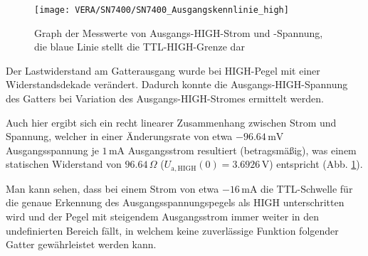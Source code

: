 \begin{figure}[h]
  \begin{center}
    \texttt{[image: VERA/SN7400/SN7400\_Ausgangskennlinie\_high]}
  \end{center}
  \caption{Graph der Messwerte von Ausgangs-HIGH-Strom und -Spannung, die blaue
    Linie stellt die TTL-HIGH-Grenze dar}
  \label{fig:aus_schnib_high}
\end{figure}

Der Lastwiderstand am Gatterausgang wurde bei HIGH-Pegel mit einer
Widerstandsdekade verändert. Dadurch konnte die Ausgangs-HIGH-Spannung des
Gatters bei Variation des Ausgangs-HIGH-Stromes ermittelt werden.


Auch hier
ergibt sich ein recht linearer Zusammenhang zwischen Strom und Spannung, welcher
in einer Änderungsrate von etwa $- 96.64 \, \si{\milli\volt}$ Ausgangsspannung
je $1 \, \si{\milli\ampere}$ Ausgangsstrom resultiert (betragsmäßig), was einem
statischen Widerstand von $96.64 \, \Omega$ ($U_\mathrm{a,HIGH}(0) = 3.6926 \,
\si{\volt}$) entspricht (Abb. \ref{fig:aus_schnib_high}).

Man kann sehen, dass bei einem Strom von etwa $-16
\,\si{\milli\ampere}$ die TTL-Schwelle für die genaue Erkennung des
Ausgangsspannungspegels als HIGH unterschritten wird und der Pegel mit
steigendem Ausgangsstrom immer weiter in den undefinierten Bereich fällt, in welchem
keine zuverlässige Funktion folgender Gatter gewährleistet werden kann.

